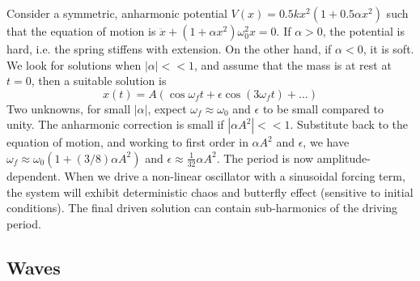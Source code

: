 \documentclass[a4paper]{article}
\begin{document}
\begin{Note}
Consider a symmetric, anharmonic potential $V(x)=0.5kx^2(1+0.5\alpha x^2)$ such that the equation of motion is $\ddot{x}+(1+\alpha x^2)\omega_0^2x=0$. If $\alpha>0$, the potential is hard, i.e. the spring stiffens with extension. On the other hand, if $\alpha<0$, it is soft. We look for solutions when $|\alpha|<<1$, and assume that the mass is at rest at $t=0$, then a suitable solution is
$$x(t)=A(\cos\omega_ft+\epsilon\cos(3\omega_ft)+...)$$
Two unknowns, for small $|\alpha|$, expect $\omega_f\approx\omega_0$ and $\epsilon$ to be small compared to unity. The anharmonic correction is small if $|\alpha A^2|<<1$. Substitute back to the equation of motion, and working to first order in $\alpha A^2$ and $\epsilon$, we have $\omega_f\approx\omega_0(1+(3/8)\alpha A^2)$ and $\epsilon\approx\frac{1}{32}\alpha A^2$. The period is now amplitude-dependent. When we drive a non-linear oscillator with a sinusoidal forcing term, the system will exhibit deterministic chaos and butterfly effect (sensitive to initial conditions). The final driven solution can contain sub-harmonics of the driving period.
\end{Note}

\newpage
\subsection{Waves}
\end{document}
